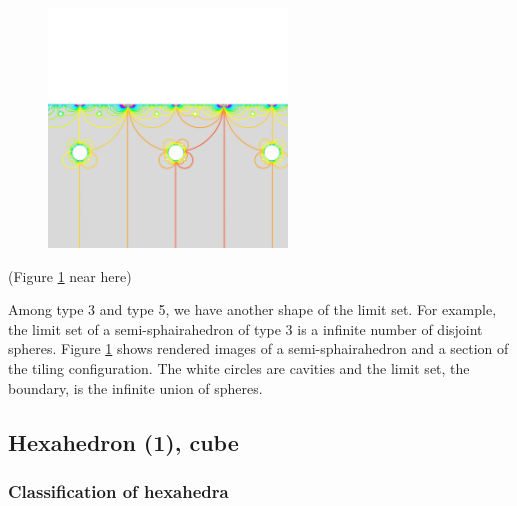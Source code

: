 \documentclass[suppldata, dvipdfmx]{interact}
\theoremstyle{plain}%
\theoremstyle{definition}
\theoremstyle{remark}
\theoremstyle{problemstyle}
\begin{document}
\begin{figure}[h!tbp]
  \centering
  \includegraphics[width=2.5in,
  keepaspectratio]{./img/sphairahedron/pentahedralPrism/holes.jpg}
 \caption{}
 \label{fig:prismHoles}
\end{figure}
\noindent(Figure \ref{fig:prismHoles} near here)

Among type 3 and type 5, we have another shape of the limit set.  For example, the limit set of a semi-sphairahedron of type 3 is a infinite number of disjoint spheres. Figure \ref{fig:prismHoles} shows rendered images of a semi-sphairahedron and a section of the tiling configuration.  The white circles are cavities and the limit set, the boundary, is the infinite union of spheres.   
 




\subsection{Hexahedron (1), cube}

\subsubsection{Classification of hexahedra}
\end{document}
